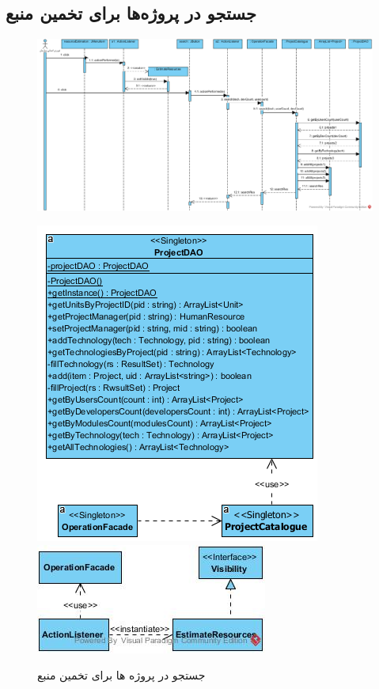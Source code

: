 \begin{landscape}
\newpage
\section{جستجو در پروژه‌ها برای تخمین منبع}
\begin{figure}[H]
	\centering
	\includegraphics[scale=0.6]{img/sequence-design/SearchInProjects}
\end{figure}
\begin{figure}[H]
	\centering
	\includegraphics[scale=0.7]{img/sequence-design/SearchInProjectsC}
	\includegraphics[scale=0.7]{img/sequence-design/SearchInProjectsUI}
	\caption{جستجو در پروژه ها برای تخمین منبع}
\end{figure}



\end{landscape}
